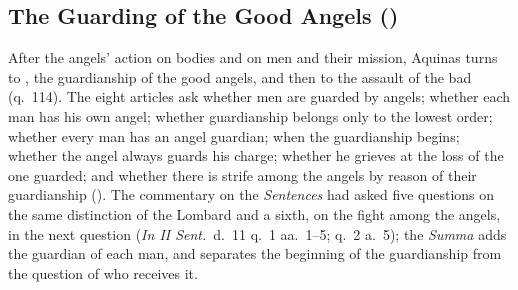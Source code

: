 \sectionguard
\subsection{The Guarding of the Good Angels ()}\label{sec:q113}

After the angels' action on bodies and on men and their mission, Aquinas
turns to , the guardianship of the good
angels, and then to the assault of the bad (q.~114). The eight articles ask
whether men are guarded by angels; whether each man has his own angel;
whether guardianship belongs only to the lowest order; whether every man has
an angel guardian; when the guardianship begins; whether the angel always
guards his charge; whether he grieves at the loss of the one guarded; and
whether there is strife among the angels by reason of their guardianship
(). The commentary on the \emph{Sentences} had asked five
questions on the same distinction of the Lombard and a sixth, on the fight
among the angels, in the next question (\emph{In II Sent.}\ d.~11 q.~1
aa.~1--5; q.~2 a.~5); the \emph{Summa} adds the guardian of each man, and
separates the beginning of the guardianship from the question of who
receives it.

